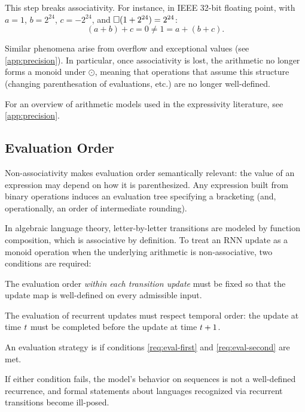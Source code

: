 \documentclass{article}
\begin{document}
This step breaks associativity. For instance, in IEEE 32-bit floating point, with $a = 1$, $b = 2^{24}$, $c = -2^{24}$, and $\square(1 + 2^{24}) = 2^{24}$:
$$
(a + b) + c = 0 \neq 1 = a + (b + c).
$$

Similar phenomena arise from overflow and exceptional values (see \cref{app:precision}). 
In particular, once associativity is lost, the arithmetic no longer forms a monoid under $\odot$, meaning that operations that assume this structure (changing parenthesation of evaluations, etc.) are no longer well-defined.

For an overview of arithmetic models used in the expressivity literature, see \cref{app:precision}.

\subsection{Evaluation Order}

Non-associativity makes evaluation order semantically relevant: the value of an expression may depend on how it is parenthesized. Any expression built from binary operations induces an evaluation tree specifying a bracketing (and, operationally, an order of intermediate rounding).

In algebraic language theory, letter-by-letter transitions are modeled by function composition, which is associative by definition. To treat an RNN update as a monoid operation when the underlying arithmetic is non-associative, two conditions are required:
\begin{requirements}
    \item The evaluation order \emph{within each transition update} must be fixed so that the update map is well-defined on every admissible input.\label{req:eval-first}
    \item The evaluation of recurrent updates must respect temporal order: the update at time $t$ must be completed before the update at time $t+1$.\label{req:eval-second}
\end{requirements}
\begin{definition}\label{def:rec-consistent}
An evaluation strategy is  if conditions \ref{req:eval-first} and \ref{req:eval-second} are met.
\end{definition}
If either condition fails, the model's behavior on sequences is not a well-defined recurrence, and formal statements about languages recognized via recurrent transitions become ill-posed.
\end{document}
